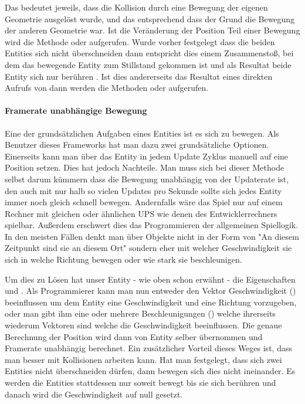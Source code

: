 Das  bedeutet jeweils, dass die Kollision durch eine Bewegung der eigenen Geometrie ausgelöst wurde, und das  entsprechend dass der Grund die Bewegung der anderen Geometrie war.
Ist die Veränderung der Position Teil einer Bewegung wird die Methode  oder  aufgerufen. Wurde vorher festgelegt dass die beiden Entities sich nicht überschneiden dann entspricht dies einem Zusammenstoß, bei dem das bewegende Entity zum Stillstand gekommen ist und als Resultat beide Entity sich nur berühren .
Ist dies andererseits das Resultat eines direkten Aufrufs von  dann werden die Methoden  oder  aufgerufen.

\paragraph{Framerate unabhängige Bewegung}

Eine der grundsätzlichen Aufgaben eines Entities ist es sich zu bewegen. Als Benutzer dieses Frameworks hat man dazu zwei grundsätzliche Optionen.
Einerseits kann man über  das Entity in jedem Update Zyklus manuell auf eine Position setzen.
Dies hat jedoch Nachteile. 
Man muss sich bei dieser Methode selbst darum kümmern dass die Bewegung unabhängig von der Updaterate ist, den auch mit nur halb so vielen Updates pro Sekunde sollte sich jedes Entity immer noch gleich schnell bewegen. Andernfalls wäre das Spiel nur auf einem Rechner mit gleichen oder ähnlichen UPS  wie denen des Entwicklerrechners spielbar.
Außerdem erschwert dies das Programmieren der allgemeinen Spiellogik. In den meisten Fällen denkt man über Objekte nicht in der Form von "An diesem Zeitpunkt sind sie an diesem Ort" sondern eher mit welcher Geschwindigkeit sie sich in welche Richtung bewegen oder wie stark sie beschleunigen.

Um dies zu Lösen hat unser Entity - wie oben schon erwähnt - die Eigenschaften  und . Als Programmierer kann man nun entweder den Vektor Geschwindigkeit () beeinflussen um dem Entity eine Geschwindigkeit und eine Richtung vorzugeben, oder man gibt ihm eine oder mehrere Beschleunigungen () welche ihrerseits wiederum Vektoren sind welche die Geschwindigkeit beeinflussen. Die genaue Berechnung der Position wird dann von Entity selber übernommen und Framerate unabhängig berechnet. Ein zusätzlicher Vorteil dieses Weges ist, dass man besser mit Kollisionen arbeiten kann. Hat man festgelegt, dass sich zwei Entities nicht überschneiden dürfen, dann bewegen sich dies nicht ineinander. Es werden die Entities stattdessen nur soweit bewegt bis sie sich berühren und danach wird die Geschwindigkeit auf null gesetzt.

